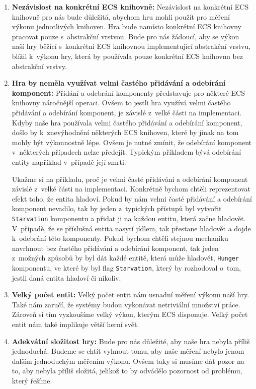 \begin{enumerate}
    \item \textbf{Nezávislost na konkrétní ECS knihovně:} Nezávislost na konkrétní ECS knihovně pro nás bude důležitá, abychom hru mohli použít pro měření výkonu jednotlivých knihoven. Hra bude namísto konkrétní ECS knihovny pracovat pouze s~abstrakční vrstvou. Bude pro nás žádoucí, aby se výkon naší hry běžící s~konkrétní ECS knihovnou implementující abstrakční vrstvu, blížil k~výkonu hry, která by používala pouze konkrétní ECS knihovnu bez abstrakční vrstvy.

    \item \textbf{Hra by neměla využívat velmi častého přidávání a odebírání komponent:} Přidání a odebrání komponenty představuje pro některé ECS knihovny náročnější operaci. Ovšem to jestli hra využívá velmi častého přidávání a odebírání komponent, je závislé z~velké části na implementaci. Kdyby naše hra používala velmi častého přidávání a odebírání komponent, došlo by k~znevýhodnění některých ECS knihoven, které by jinak na tom mohly být výkonnostně lépe. Ovšem je nutné zmínit, že odebírání komponent v~některých případech nelze předejít. Typickým příkladem bývá odebírání entity například v~případě její smrti.

    Ukažme si na příkladu, proč je velmi časté přidávání a odebírání komponent závislé z~velké části na implementaci. Konkrétně bychom chtěli reprezentovat efekt toho, že entita hladoví. Pokud by nám velmi časté přidávání a odebírání komponent nevadilo, tak by jeden z~typických přístupů byl vytvořit \verb|Starvation| komponentu a přidat ji na každou entitu, která začne hladovět. V~případě, že se příslušná entita nasytí jídlem, tak přestane hladovět a dojde k~odebrání této komponenty. Pokud bychom chtěli stejnou mechaniku navrhnout bez častého přidávání a odebírání komponent, tak jeden z~možných způsobů by byl dát každé entitě, která může hladovět, \texttt{Hunger} komponentu, ve které by byl flag \verb|Starvation|, který by rozhodoval o~tom, jestli daná entita hladoví či nikoliv.
    
    \item \textbf{Velký počet entit:} Velký počet entit nám usnadní měření výkonu naší hry. Také nám zaručí, že systémy budou vykonávat netriviální množství práce. Zároveň si tím vyzkoušíme velký výkon, kterým ECS disponuje. Velký počet entit nám také implikuje větší herní svět.
    
    \item \textbf{Adekvátní složitost hry:} Bude pro nás důležité, aby naše hra nebyla příliš jednoduchá. Budeme se chtít vyhnout tomu, aby naše měření nebylo jenom dalším jednoduchým měřením výkonu. Ovšem taky si musíme dát pozor na to, aby nebyla příliš složitá, jelikož to by odvádělo pozornost od problému, který řešíme.
\end{enumerate}


